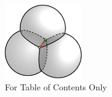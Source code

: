 \documentclass[journal=jacsat,manuscript=article]{achemso}
\begin{document}


\newpage

\section{ }

\begin{figure}[H]
        \includegraphics[width=0.3\textwidth]{Figures/3spheresIntersection.pdf}
    \caption*{\normalsize For Table of Contents Only}  
\end{figure}
\end{document}
